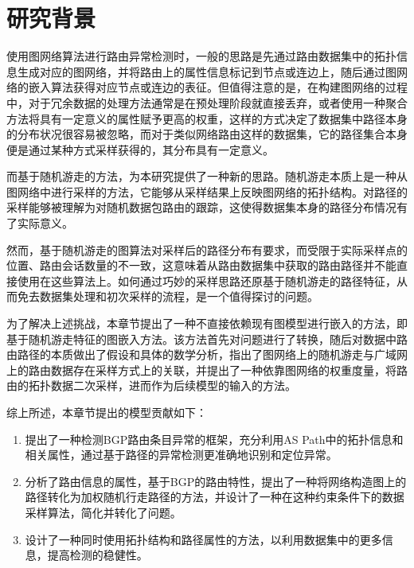 \section{研究背景}

使用图网络算法进行路由异常检测时，一般的思路是先通过路由数据集中的拓扑信息生成对应的图网络，并将路由上的属性信息标记到节点或连边上，随后通过图网络的嵌入算法获得对应节点或连边的表征。但值得注意的是，在构建图网络的过程中，对于冗余数据的处理方法通常是在预处理阶段就直接丢弃，或者使用一种聚合方法将具有一定意义的属性赋予更高的权重，这样的方式决定了数据集中路径本身的分布状况很容易被忽略，而对于类似网络路由这样的数据集，它的路径集合本身便是通过某种方式采样获得的，其分布具有一定意义。

而基于随机游走的方法，为本研究提供了一种新的思路。随机游走本质上是一种从图网络中进行采样的方法，它能够从采样结果上反映图网络的拓扑结构。对路径的采样能够被理解为对随机数据包路由的跟踪，这使得数据集本身的路径分布情况有了实际意义。

然而，基于随机游走的图算法对采样后的路径分布有要求，而受限于实际采样点的位置、路由会话数量的不一致，这意味着从路由数据集中获取的路由路径并不能直接使用在这些算法上。如何通过巧妙的采样思路还原基于随机游走的路径特征，从而免去数据集处理和初次采样的流程，是一个值得探讨的问题。

为了解决上述挑战，本章节提出了一种不直接依赖现有图模型进行嵌入的方法，即基于随机游走特征的图嵌入方法。该方法首先对问题进行了转换，随后对数据中路由路径的本质做出了假设和具体的数学分析，指出了图网络上的随机游走与广域网上的路由数据存在采样方式上的关联，并提出了一种依靠图网络的权重度量，将路由的拓扑数据二次采样，进而作为后续模型的输入的方法。

综上所述，本章节提出的模型贡献如下：

\begin{enumerate}
    \item 提出了一种检测BGP路由条目异常的框架，充分利用AS Path中的拓扑信息和相关属性，通过基于路径的异常检测更准确地识别和定位异常。
    \item 分析了路由信息的属性，基于BGP的路由特性，提出了一种将网络构造图上的路径转化为加权随机行走路径的方法，并设计了一种在这种约束条件下的数据采样算法，简化并转化了问题。
    \item 设计了一种同时使用拓扑结构和路径属性的方法，以利用数据集中的更多信息，提高检测的稳健性。
\end{enumerate}
